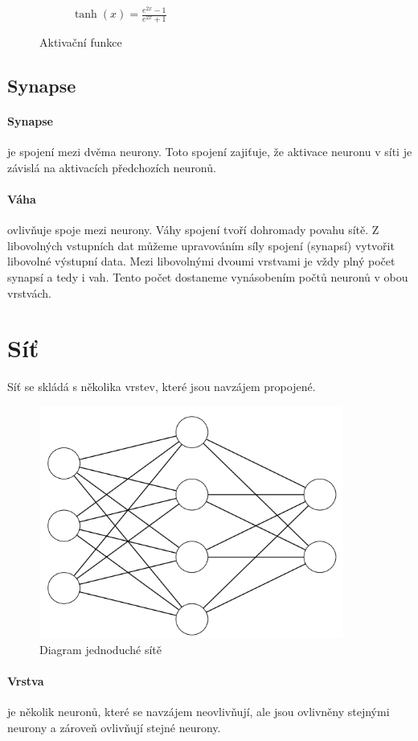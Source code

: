 \documentclass[12pt,a4paper]{report}
\begin{document}
\begin{figure}
\begin{subfigure}[h]{0.3\textwidth}
				\caption{$\tanh(x)=\frac{e^{2x}-1}{e^{2x}+1}$}
				\label{fig:hyperbolic tangent}
			\end{subfigure}
			\caption{Aktivační funkce}\label{fig:activation functions}
		\end{figure}
	\subsection{Synapse}
		\paragraph{Synapse} je spojení mezi dvěma neurony. Toto spojení zajiťuje, že aktivace neuronu v síti je závislá na aktivacích předchozích neuronů.
		\paragraph{Váha}
		ovlivňuje spoje mezi neurony. Váhy spojení tvoří dohromady povahu sítě. Z libovolných vstupních dat můžeme upravováním síly spojení (synapsí) vytvořit libovolné výstupní data. Mezi libovolnými dvoumi vrstvami je vždy plný počet synapsí a tedy i vah. Tento počet dostaneme vynásobením počtů neuronů v obou vrstvách.
\section{Síť}
	Síť se skládá s několika vrstev, které jsou navzájem propojené.
	\begin{figure}[h]
		\centering
		\includegraphics[width=10cm]{nn3-4-2}
		\caption{Diagram jednoduché sítě}
	\end{figure}
	\paragraph{Vrstva}
	je několik neuronů, které se navzájem neovlivňují, ale jsou ovlivněny stejnými neurony a zároveň ovlivňují stejné neurony.
\end{document}
